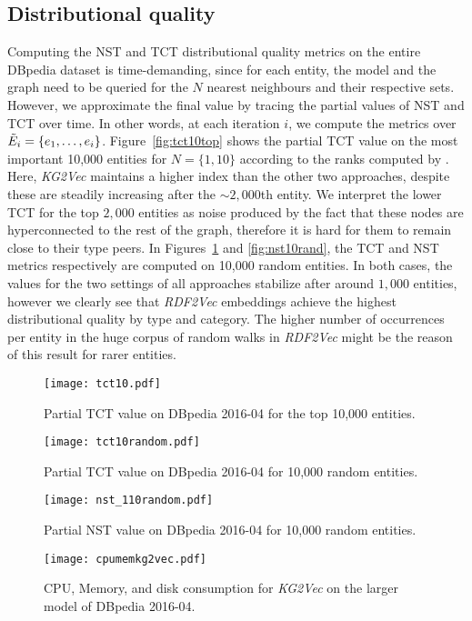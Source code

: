 \documentclass[graybox]{archivesofdatascience}
\newcommand{\ktvplain}{KG2Vec\xspace}
\newcommand{\ktv}{\textit{\ktvplain}\xspace}
\newcommand{\rtv}{\textit{RDF2Vec}\xspace}
\begin{document}
\vspace{-1cm}

\subsection{Distributional quality}

Computing the NST and TCT distributional quality metrics on the entire DBpedia dataset is time-demanding, since for each entity, the model and the graph need to be queried for the $N$ nearest neighbours and their respective sets.
However, we approximate the final value by tracing the partial values of NST and TCT over time.
In other words, at each iteration $i$, we compute the metrics over $\Tilde{E}_i = \{e_1, \dots, e_i\}$.
Figure~\ref{fig:tct10top} shows the partial TCT value on the most important 10,000 entities for $N=\{1,10\}$ according to the ranks computed by \cite{Thalhammer2016}.
Here, \ktv maintains a higher index than the other two approaches, despite these are steadily increasing after the $\sim2,000$th entity.
We interpret the lower TCT for the top $2,000$ entities as noise produced by the fact that these nodes are hyperconnected to the rest of the graph, therefore it is hard for them to remain close to their type peers.
In Figures~\ref{fig:tct10rand} and \ref{fig:nst10rand}, the TCT and NST metrics respectively are computed on 10,000 random entities.
In both cases, the values for the two settings of all approaches stabilize after around $1,000$ entities, however we clearly see that \rtv embeddings achieve the highest distributional quality by type and category.
The higher number of occurrences per entity in the huge corpus of random walks in \rtv might be the reason of this result for rarer entities.

\begin{figure}[htbp]
    \begin{multicols}{2}
    \texttt{[image: tct10.pdf]}\par
	\caption{Partial TCT value on DBpedia 2016-04 for the top 10,000 entities.}
	\label{fig:tct10top}
    \texttt{[image: tct10random.pdf]}\par
	\caption{Partial TCT value on DBpedia 2016-04 for 10,000 random entities.}
	\label{fig:tct10rand}
    \end{multicols}
\end{figure}
\begin{figure}[htbp]
    \begin{multicols}{2}
    \texttt{[image: nst\_110random.pdf]}\par
	\caption{Partial NST value on DBpedia 2016-04 for 10,000 random entities.}
	\label{fig:nst10rand}
    \texttt{[image: cpumemkg2vec.pdf]}\par
	\caption{CPU, Memory, and disk consumption for \ktv on the larger model of DBpedia 2016-04.}
	\label{fig:cpumem}
    \end{multicols}	
\end{figure}
\end{document}
